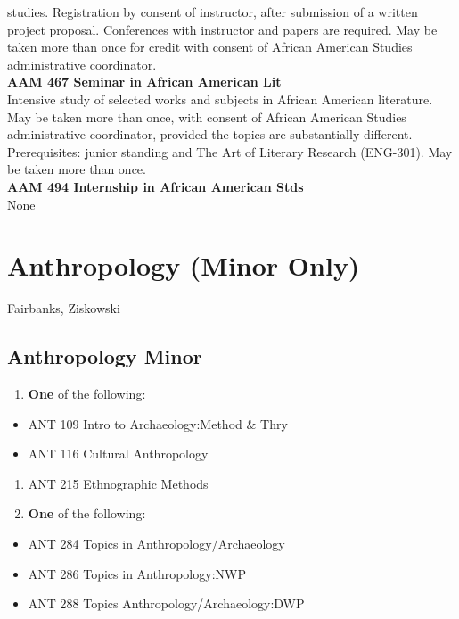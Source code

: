 \documentclass[
  letterpaper,
]{scrbook}
\providecommand{\tightlist}{%
  \setlength{\itemsep}{0pt}\setlength{\parskip}{0pt}}
\begin{document}
studies. Registration by consent of instructor, after submission of a
written project proposal. Conferences with instructor and papers are
required. May be taken more than once for credit with consent of African
American Studies administrative coordinator.\\
\textbf{AAM 467 Seminar in African American Lit}\\
Intensive study of selected works and subjects in African American
literature. May be taken more than once, with consent of African
American Studies administrative coordinator, provided the topics are
substantially different. Prerequisites: junior standing and The Art of
Literary Research (ENG-301). May be taken more than once.\\
\textbf{AAM 494 Internship in African American Stds}\\
None

\section{Anthropology (Minor Only)}\label{anthropology-minor-only}

Fairbanks, Ziskowski

\subsection{Anthropology Minor}\label{anthropology-minor}

\begin{enumerate}
\def\labelenumi{\arabic{enumi}.}
\tightlist
\item
  \textbf{One} of the following:
\end{enumerate}

\begin{itemize}
\tightlist
\item
  ANT 109 Intro to Archaeology:Method \& Thry
\item
  ANT 116 Cultural Anthropology
\end{itemize}

\begin{enumerate}
\def\labelenumi{\arabic{enumi}.}
\setcounter{enumi}{1}
\tightlist
\item
  ANT 215 Ethnographic Methods
\item
  \textbf{One} of the following:
\end{enumerate}

\begin{itemize}
\tightlist
\item
  ANT 284 Topics in Anthropology/Archaeology
\item
  ANT 286 Topics in Anthropology:NWP
\item
  ANT 288 Topics Anthropology/Archaeology:DWP
\end{itemize}
\end{document}
